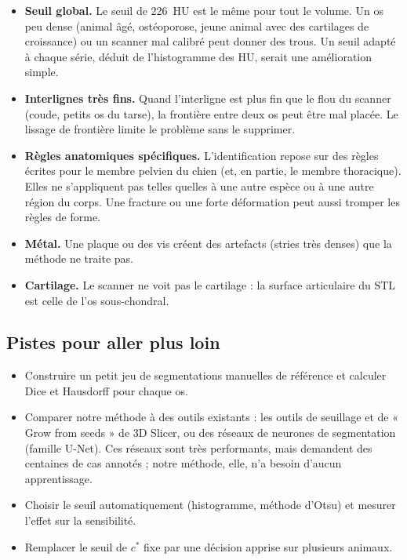 \documentclass[11pt,a4paper]{article}
\begin{document}
\begin{itemize}
  \item \textbf{Seuil global.} Le seuil de 226~HU est le même pour tout le volume. Un os peu dense (animal âgé,
  ostéoporose, jeune animal avec des cartilages de croissance) ou un scanner mal calibré peut donner des trous. Un
  seuil adapté à chaque série, déduit de l'histogramme des HU, serait une amélioration simple.
  \item \textbf{Interlignes très fins.} Quand l'interligne est plus fin que le flou du scanner (coude, petits os du
  tarse), la frontière entre deux os peut être mal placée. Le lissage de frontière limite le problème sans le
  supprimer.
  \item \textbf{Règles anatomiques spécifiques.} L'identification repose sur des règles écrites pour le membre
  pelvien du chien (et, en partie, le membre thoracique). Elles ne s'appliquent pas telles quelles à une autre espèce
  ou à une autre région du corps. Une fracture ou une forte déformation peut aussi tromper les règles de forme.
  \item \textbf{Métal.} Une plaque ou des vis créent des artefacts (stries très denses) que la méthode ne traite pas.
  \item \textbf{Cartilage.} Le scanner ne voit pas le cartilage : la surface articulaire du STL est celle de l'os
  sous-chondral.
\end{itemize}

\subsection{Pistes pour aller plus loin}

\begin{itemize}
  \item Construire un petit jeu de segmentations manuelles de référence et calculer Dice et Hausdorff pour chaque
  os.
  \item Comparer notre méthode à des outils existants : les outils de seuillage et de « Grow from seeds » de 3D Slicer,
  ou des réseaux de neurones de segmentation (famille U-Net). Ces réseaux sont très performants, mais demandent des
  centaines de cas annotés ; notre méthode, elle, n'a besoin d'aucun apprentissage.
  \item Choisir le seuil automatiquement (histogramme, méthode d'Otsu) et mesurer l'effet sur la sensibilité.
  \item Remplacer le seuil de $c^*$ fixe par une décision apprise sur plusieurs animaux.
\end{itemize}
\end{document}
